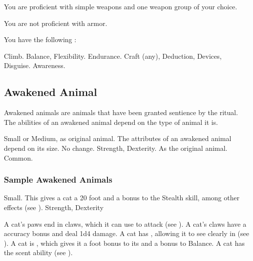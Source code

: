             You are proficient with simple weapons and one weapon group of your choice.

            You are not proficient with armor.

            You have the following :
            \begin{itemize}
                 Climb.
                 Balance, Flexibility.
                 Endurance.
                 Craft (any), Deduction, Devices, Disguise.
                 Awareness.
            \end{itemize}

    \subsection{Awakened Animal}

        Awakened animals are animals that have been granted sentience by the  ritual.
        The abilities of an awakened animal depend on the type of animal it is.

         Small or Medium, as original animal.
         The attributes of an awakened animal depend on its size.
         No change.
          Strength,  Dexterity.
         As the original animal.
         Common.

        \subsubsection{Sample Awakened Animals}


             Small. This gives a cat a 20 foot  and a  bonus to the Stealth skill, among other effects (see ).
              Strength,  Dexterity
            \begin{itemize}
                 A cat's paws end in claws, which it can use to attack (see ). A cat's claws have a  accuracy bonus and deal 1d4 damage.
                 A cat has , allowing it to see clearly in  (see ).
                 A cat is , which gives it a  foot bonus to its  and a  bonus to Balance.
                 A cat has the scent ability (see ).
            \end{itemize}

